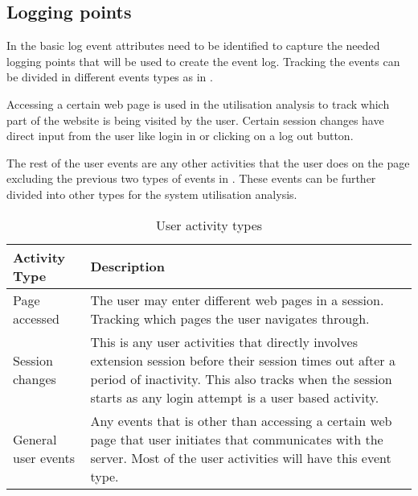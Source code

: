 \subsection{Logging points}
In  the basic log event attributes need to be identified to capture the needed logging points that will be used to create the event log. Tracking the events can be divided in different events types as in . \par Accessing a certain web page is used in the utilisation analysis to track which part of the website is being visited by the user. Certain session changes have direct input from the user like login in or clicking on a log out button. \par The rest of the user events are any other activities that the user does on the page excluding the previous two types of events in . These events can be further divided into other types for the system utilisation analysis.

\begin{table}[!htb]
	\centering
	\small
	\caption[User activity types]
	{User activity types}
	\label{tbl:Ch2_User_ActivityTypes}
	\begin{tabularx}{\textwidth}{|l|X|}
		\hline \textbf{Activity Type} & \textbf{Description} \\
		\hline Page accessed & The user may enter different web pages in a session. Tracking which pages the user navigates through.\\
		\hline Session changes & This is any user activities that directly involves extension session before their session times out after a period of inactivity. This also tracks when the session starts as any login attempt is a user based activity.\\
		\hline General user events & Any events that is other than accessing a certain web page that user initiates that communicates with the server. Most of the user activities will have this event type.\\ 
		\hline
	\end{tabularx}
\end{table}

